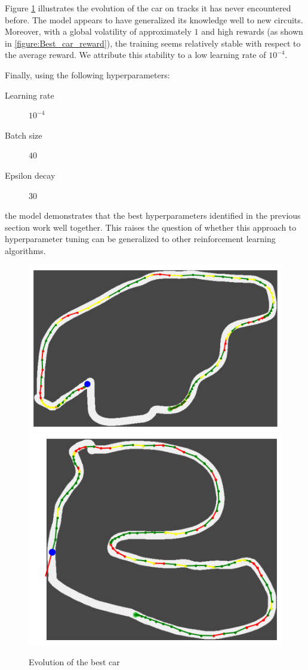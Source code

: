 \documentclass[11pt,a4paper]{article}
\newcounter{fig}
\begin{document}
Figure \ref{figure:Evolution of best car} illustrates the evolution of the car on tracks it has never encountered before. The model appears to have generalized its knowledge well to new circuits. Moreover, with a global volatility of approximately $1$ and high rewards (as shown in \ref{figure:Best_car_reward}), the training seems relatively stable with respect to the average reward. We attribute this stability to a low learning rate of $10^{-4}$.  

Finally, using the following hyperparameters:  
\begin{description}
    \item[Learning rate] $10^{-4}$  
    \item[Batch size] $40$  
    \item[Epsilon decay] $30$  
\end{description}  
the model demonstrates that the best hyperparameters identified in the previous section work well together. This raises the question of whether this approach to hyperparameter tuning can be generalized to other reinforcement learning algorithms.  


        \begin{figure}[h]
            \centering
            \includegraphics[scale=0.4]{image.png}
            \includegraphics[scale=0.4]{best_car_track.png}
            \caption{Evolution of the best car}
            \label{figure:Evolution of best car}
        \end{figure}
\end{document}
